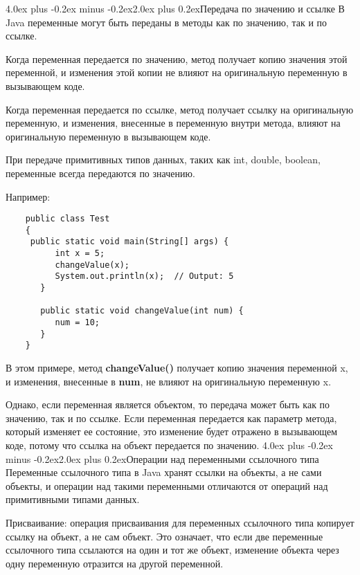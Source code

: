 \documentclass[12pt, a4paper]{book}%
\makeatletter
\renewcommand{\section}{\@startsection{section}{1}{1pt}%
{4.0ex plus -0.2ex minus -0.2ex}{2.0ex plus 0.2ex}{\centering\bf}}%
\makeatother
\begin{document}
{\section{Передача по значению и ссылке}
В Java переменные могут быть переданы в методы как по значению, так и по ссылке. 

Когда переменная передается по значению, метод получает копию значения этой переменной, и изменения этой копии не влияют на оригинальную переменную в вызывающем коде. 

Когда переменная передается по ссылке, метод получает ссылку на оригинальную переменную, и изменения, внесенные в переменную внутри метода, влияют на оригинальную переменную в вызывающем коде.

При передаче примитивных типов данных, таких как int, double, boolean, переменные всегда передаются по значению. 

Например:
\begin{lstlisting}
    public class Test
    {
     public static void main(String[] args) {
          int x = 5;
          changeValue(x);
          System.out.println(x);  // Output: 5
       }
       
       public static void changeValue(int num) {
          num = 10;
       }
    }
\end{lstlisting}

В этом примере, метод {\bf changeValue()} получает копию значения переменной x, и изменения, внесенные в {\bf num}, не влияют на оригинальную переменную x.

Однако, если переменная является объектом, то передача может быть как по значению, так и по ссылке. Если переменная передается как параметр метода, который изменяет ее состояние, это изменение будет отражено в вызывающем коде, потому что ссылка на объект передается по значению.
\section{Операции над переменными ссылочного типа}
Переменные ссылочного типа в Java хранят ссылки на объекты, а не сами объекты, и операции над такими переменными отличаются от операций над примитивными типами данных.

Присваивание: операция присваивания для переменных ссылочного типа копирует ссылку на объект, а не сам объект. Это означает, что если две переменные ссылочного типа ссылаются на один и тот же объект, изменение объекта через одну переменную отразится на другой переменной.

}
\end{document}
